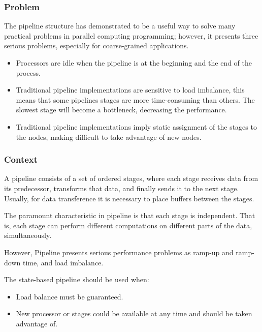 \subsubsection{Problem}
The pipeline structure has demonstrated to be a useful way to solve many practical problems in parallel computing programming; however, it presents three serious problems, especially for coarse-grained applications. 

\begin{itemize}
	\item  Processors are idle when the pipeline is at the beginning and the end of the process.
	      
	\item  Traditional pipeline implementations are sensitive to load imbalance, this means that some pipelines stages are more time-consuming than others. The slowest stage will become a bottleneck, decreasing the performance.
	      
	\item  Traditional pipeline implementations imply static assignment of the stages to the nodes, making difficult to take advantage of new nodes.
\end{itemize}

\subsubsection{Context}
A pipeline consists of a set of ordered stages, where each stage receives data from its predecessor, transforms that data, and finally sends it to the next stage. Usually, for data transference it is necessary to place buffers between the stages.

The paramount characteristic in pipeline is that each stage is independent. That is, each stage can perform different computations on different parts of the data, simultaneously.

However, Pipeline presents serious performance problems as ramp-up and ramp-down time, and load imbalance. 

The state-based pipeline should be used when:

\begin{itemize}
	\item  Load balance must be guaranteed.
	      
	\item  New processor or stages could be available at any time and should be taken advantage of.
\end{itemize}

